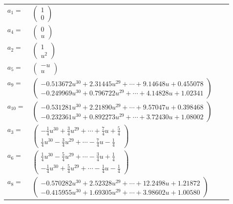 \documentclass[1p]{elsarticle_modified}
\theoremstyle{definition}
\begin{document}
\begin{tabular}{m{7pt} m{180pt} m{7pt} m{180pt} }
\flushright $a_{1}=$&$\begin{pmatrix}1\\0\end{pmatrix}$ \\
\flushright $a_{4}=$&$\begin{pmatrix}0\\u\end{pmatrix}$ \\
\flushright $a_{2}=$&$\begin{pmatrix}1\\u^2\end{pmatrix}$ \\
\flushright $a_{5}=$&$\begin{pmatrix}- u\\u\end{pmatrix}$ \\
\flushright $a_{9}=$&$\begin{pmatrix}-0.513672 u^{30}+2.31445 u^{29}+\cdots+9.14648 u+0.455078\\-0.249969 u^{30}+0.796722 u^{29}+\cdots+4.14828 u+1.02341\end{pmatrix}$ \\
\flushright $a_{10}=$&$\begin{pmatrix}-0.531281 u^{30}+2.21890 u^{29}+\cdots+9.57047 u+0.398468\\-0.232361 u^{30}+0.892273 u^{29}+\cdots+3.72430 u+1.08002\end{pmatrix}$ \\
\flushright $a_{3}=$&$\begin{pmatrix}-\frac{1}{4} u^{30}+\frac{3}{4} u^{29}+\cdots+\frac{7}{4} u+\frac{5}{4}\\\frac{1}{4} u^{30}-\frac{3}{4} u^{29}+\cdots-\frac{7}{4} u-\frac{1}{4}\end{pmatrix}$ \\
\flushright $a_{6}=$&$\begin{pmatrix}\frac{1}{4} u^{30}-\frac{5}{4} u^{29}+\cdots-\frac{3}{4} u+\frac{1}{4}\\-\frac{1}{4} u^{30}+\frac{5}{4} u^{29}+\cdots-\frac{1}{4} u-\frac{1}{4}\end{pmatrix}$ \\
\flushright $a_{8}=$&$\begin{pmatrix}-0.570282 u^{30}+2.52328 u^{29}+\cdots+12.2498 u+1.21872\\-0.415955 u^{30}+1.69305 u^{29}+\cdots+3.98602 u+1.00580\end{pmatrix}$ \\

\end{tabular}
\end{document}
